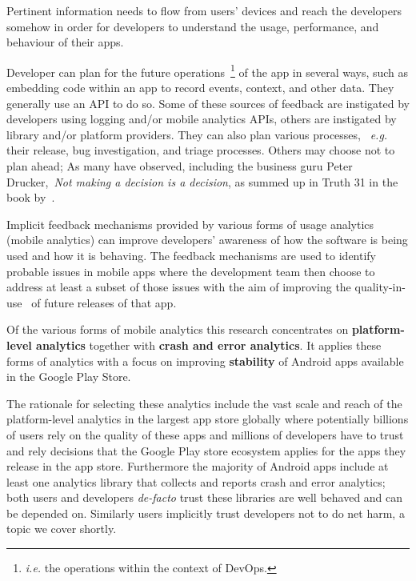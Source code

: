 Pertinent information needs to flow from users' devices and reach the developers somehow in order for developers to understand the usage, performance, and behaviour of their apps. 

Developer can plan for the future operations~\footnote{\emph{i.e.} the operations within the context of DevOps.} of the app in several ways, such as embedding code within an app to record events, context, and other data. They generally use an API to do so. Some of these sources of feedback are instigated by developers using logging and/or mobile analytics APIs, others are instigated by library and/or platform providers.
%
They can also plan various processes, ~\emph{e.g.} their release, bug investigation, and triage processes. Others may choose not to plan ahead; As many have observed, including the business guru Peter Drucker,~\emph{Not making a decision is a decision}, as summed up in Truth 31 in the book by~\cite{gunther2013truth_about_better_decision_making}.

Implicit feedback mechanisms provided by various forms of usage analytics (mobile analytics) can improve developers' awareness of how the software is being used and how it is behaving.  
The feedback mechanisms are used to identify probable issues in mobile apps where the development team then choose to address at least a subset of those issues with the aim of improving the quality-in-use~\citep{bevan1999_89_quality_in_use_meeting_user_needs_for_quality} of future releases of that app. 

Of the various forms of mobile analytics this research concentrates on \textbf{platform-level analytics} together with \textbf{crash and error analytics}. It applies these forms of analytics with a focus on improving \textbf{stability} of Android apps available in the Google Play Store.


The rationale for selecting these analytics include the vast scale and reach of the platform-level analytics in the largest app store globally where potentially billions of users rely on the quality of these apps and millions of developers have to trust and rely decisions that the Google Play store ecosystem applies for the apps they release in the app store. Furthermore the majority of Android apps include at least one analytics library that collects and reports crash and error analytics; both users and developers \emph{de-facto} trust these libraries are well behaved and can be depended on. Similarly users implicitly trust developers not to do net harm, a topic we cover shortly.

